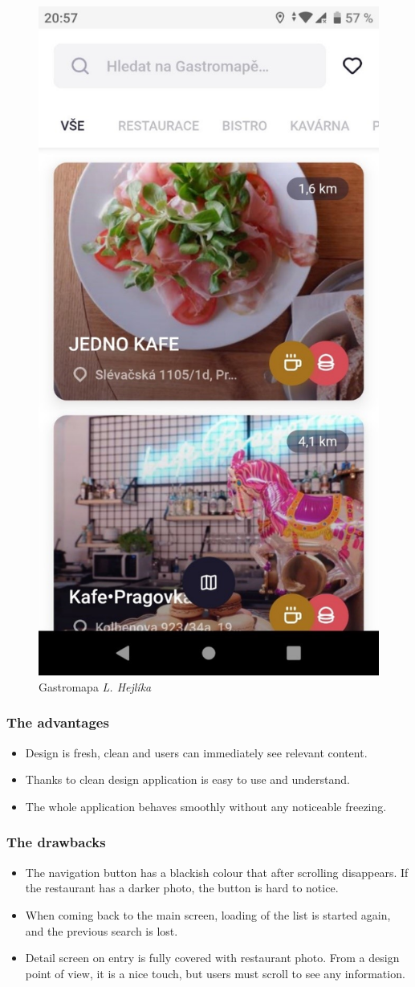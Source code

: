 \begin{figure}[h]
    \centering
    \includegraphics[width=0.33\linewidth]{img/analysis/gastromapa_hejlik.jpg}
    \caption{Gastromapa \textit{L. Hejlíka} }
    \label{fig:Gastromapa L. Hejlika}
\end{figure}

\subsubsection{The advantages}
\begin{itemize}
    \item Design is fresh, clean and users can immediately see relevant content.
    \item Thanks to clean design application is easy to use and understand.
    \item The whole application behaves smoothly without any noticeable freezing.
\end{itemize}

\subsubsection{The drawbacks}
\begin{itemize}
    \item The navigation button has a blackish colour that after scrolling disappears. If the restaurant has a darker photo, the button is hard to notice. 
    \item When coming back to the main screen, loading of the list is started again, and the previous search is lost.
    \item Detail screen on entry is fully covered with restaurant photo. From a design point of view, it is a nice touch, but users must scroll to see any information. 
\end{itemize}

